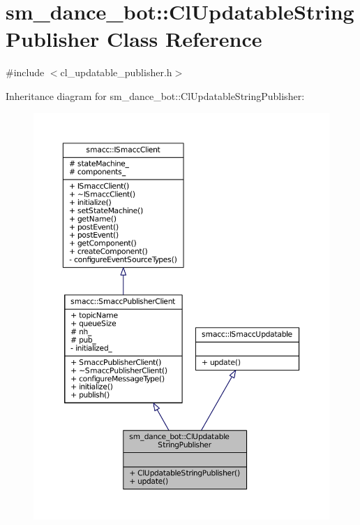 \hypertarget{classsm__dance__bot_1_1ClUpdatableStringPublisher}{}\section{sm\+\_\+dance\+\_\+bot\+:\+:Cl\+Updatable\+String\+Publisher Class Reference}
\label{classsm__dance__bot_1_1ClUpdatableStringPublisher}


{\ttfamily \#include $<$cl\+\_\+updatable\+\_\+publisher.\+h$>$}



Inheritance diagram for sm\+\_\+dance\+\_\+bot\+:\+:Cl\+Updatable\+String\+Publisher\+:
\nopagebreak
\begin{figure}[H]
\begin{center}
\leavevmode
\includegraphics[width=350pt]{classsm__dance__bot_1_1ClUpdatableStringPublisher__inherit__graph}
\end{center}
\end{figure}


